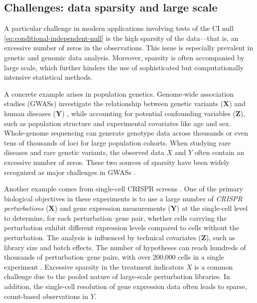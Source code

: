 \documentclass[12pt]{article}
\theoremstyle{definition}
\newcommand{\prx}{\bm X}								%
\newcommand{\srx}{X}									%
\newcommand{\prz}{\bm Z}								%
\newcommand{\pry}{{\bm Y}}								%
\newcommand{\sry}{Y}									%
\begin{document}
  \subsection{Challenges: data sparsity and large scale} \label{sec:statistical-computational-challenges}
  
  A particular challenge in modern applications involving tests of the CI null \eqref{eq:conditional-independent-null} is the high sparsity of the data—that is, an excessive number of zeros in the observations. This issue is especially prevalent in genetic and genomic data analysis. Moreover, sparsity is often accompanied by large scale, which further hinders the use of sophisticated but computationally intensive statistical methods.
  
  \small{
  A concrete example arises in population genetics. Genome-wide association studies (GWASs) investigate the relationship between genetic variants ($\prx$) and human diseases ($\pry$) \citep{visscher201710}, while accounting for potential confounding variables ($\prz$), such as population structure and experimental covariates like age and sex. Whole-genome sequencing can generate genotype data across thousands or even tens of thousands of loci for large population cohorts. When studying rare diseases and rare genetic variants, the observed data $\srx$ and $\sry$ often contain an excessive number of zeros. These two sources of sparsity have been widely recognized as major challenges in GWASs \citep{auer2015rare,dey2017fast,zhao2020uk,turro2020whole}.
  
  Another example comes from single-cell CRISPR screens \citep{Dixit2016,Adamson2016,Jaitin2016,Datlinger2017}. One of the primary biological objectives in these experiments is to use a large number of \textit{CRISPR perturbations} ($\prx$) and gene expression measurements ($\pry$) at the single-cell level to determine, for each perturbation–gene pair, whether cells carrying the perturbation exhibit different expression levels compared to cells without the perturbation. The analysis is influenced by technical covariates ($\prz$), such as library size and batch effects. The number of hypotheses can reach hundreds of thousands of perturbation–gene pairs, with over 200,000 cells in a single experiment \citep{Gasperini2019a}. Excessive sparsity in the treatment indicators $\srx$ is a common challenge due to the pooled nature of large-scale perturbation libraries. In addition, the single-cell resolution of gene expression data often leads to sparse, count-based observations in $\sry$.
  
  }
  
\end{document}

